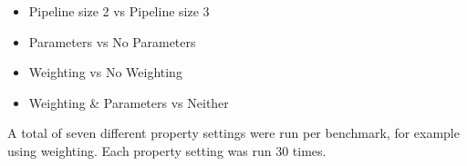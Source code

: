 \begin{itemize}
\item Pipeline size 2 vs Pipeline size 3
\item Parameters vs No Parameters
\item Weighting vs No Weighting
\item Weighting \& Parameters vs Neither
\end{itemize}

A total of seven different property settings were run per benchmark, for example using weighting. Each property setting was run 30 times.